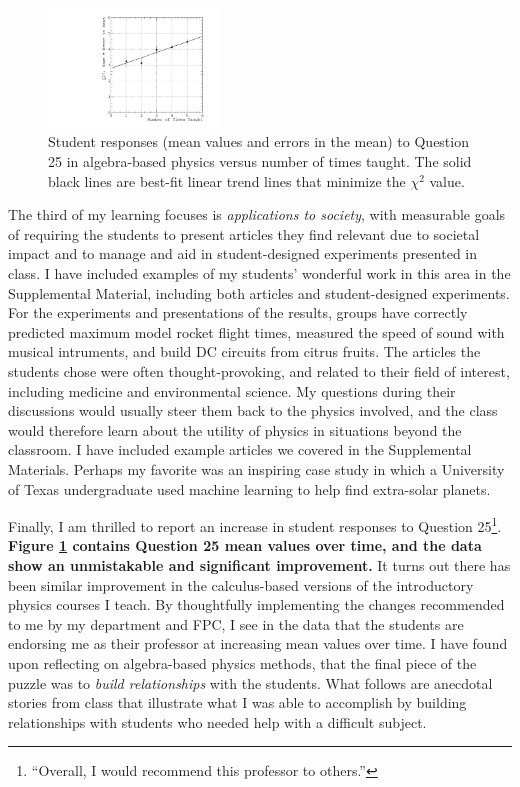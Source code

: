 \documentclass[../../main.tex]{subfiles}
\begin{document}
\begin{figure}
\centering
\includegraphics[width=0.4\textwidth]{Q25_algebra_based.pdf}
\caption{\label{fig:courses:intro_q25}  Student responses (mean values and errors in the mean) to Question 25 in algebra-based physics versus number of times taught.  The solid black lines are best-fit linear trend lines that minimize the $\chi^2$ value.}
\end{figure}

The third of my learning focuses is \textit{applications to society}, with measurable goals of requiring the students to present articles they find relevant due to societal impact and to manage and aid in student-designed experiments presented in class.  I have included examples of my students' wonderful work in this area in the Supplemental Material, including both articles and student-designed experiments.  For the experiments and presentations of the results, groups have correctly predicted maximum model rocket flight times, measured the speed of sound with musical intruments, and build DC circuits from citrus fruits.  The articles the students chose were often thought-provoking, and related to their field of interest, including medicine and environmental science.  My questions during their discussions would usually steer them back to the physics involved, and the class would therefore learn about the utility of physics in situations beyond the classroom.  I have included example articles we covered in the Supplemental Materials.  Perhaps my favorite was an inspiring case study in which a University of Texas undergraduate used machine learning to help find extra-solar planets.

Finally, I am thrilled to report an increase in student responses to Question 25\footnote{``Overall, I would recommend this professor to others.''}. \textbf{Figure \ref{fig:courses:intro_q25} contains Question 25 mean values over time, and the data show an unmistakable and significant improvement.}  It turns out there has been similar improvement in the calculus-based versions of the introductory physics courses I teach.  By thoughtfully implementing the changes recommended to me by my department and FPC, I see in the data that the students are endorsing me as their professor at increasing mean values over time.  I have found upon reflecting on algebra-based physics methods, that the final piece of the puzzle was to \textit{build relationships} with the students.  What follows are anecdotal stories from class that illustrate what I was able to accomplish by building relationships with students who needed help with a difficult subject.  \\ \hspace{0.1cm}
\end{document}
